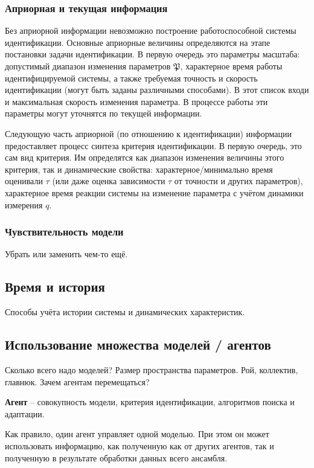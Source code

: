 \documentclass[a4paper,12pt]{article}
\begin{document}
\subsubsection{Априорная и текущая информация}

Без априорной информации невозможно построение
работоспособной системы идентификации. Основные
априорные величины определяются на этапе постановки
задачи идентификации. В первую очередь это
параметры масштаба: допустимый диапазон
изменения параметров \( \mathfrak{P}\),
характерное время работы
идентифицируемой системы, а также
требуемая точность и скорость идентификации
(могут быть заданы различными способами).
В этот список входи и максимальная скорость изменения параметра.
В процессе работы эти параметры могут уточнятся по текущей информации.

Следующую часть априорной (по отношению к идентификации) информации
предоставляет процесс синтеза критерия идентификации.
В первую очередь, это сам вид критерия. Им определятся
как диапазон изменения величины этого критерия, так и
динамические свойства: характерное/минимально время
оценивали \(\tau\) (или даже оценка зависимости $\tau$ от точности и других параметров),
характерное время реакции системы на изменение
параметра с учётом динамики измерения \(q\).


\subsubsection{Чувствительность модели}

Убрать или заменить чем-то ещё.


\subsection{Время и история}

Способы учёта истории системы и динамических характеристик.

\subsection{ Использование множества моделей / агентов}

Сколько всего надо моделей? Размер пространства параметров.
Рой, коллектив, главнюк.
Зачем агентам перемещаться?

\textbf{ Агент } -- совокупность модели, критерия идентификации,
алгоритмов поиска и адаптации.

Как правило, один агент управляет одной моделью. При этом
он может использовать информацию, как полученную как от других
агентов, так и полученную в результате обработки данных
всего ансамбля.
\end{document}
